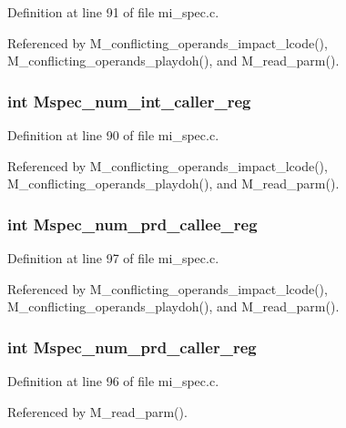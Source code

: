 Definition at line 91 of file mi\_\-spec.c.

Referenced by M\_\-conflicting\_\-operands\_\-impact\_\-lcode(), M\_\-conflicting\_\-operands\_\-playdoh(), and M\_\-read\_\-parm().
\subsubsection{\setlength{\rightskip}{0pt plus 5cm}int \bf{Mspec\_\-num\_\-int\_\-caller\_\-reg}}\label{m__spec_8h_4a05d2ec29e2bcb55d1f804e384021ef}




Definition at line 90 of file mi\_\-spec.c.

Referenced by M\_\-conflicting\_\-operands\_\-impact\_\-lcode(), M\_\-conflicting\_\-operands\_\-playdoh(), and M\_\-read\_\-parm().
\subsubsection{\setlength{\rightskip}{0pt plus 5cm}int \bf{Mspec\_\-num\_\-prd\_\-callee\_\-reg}}\label{m__spec_8h_b75395ef938b5ab6a4c21981b5a3ba8c}




Definition at line 97 of file mi\_\-spec.c.

Referenced by M\_\-conflicting\_\-operands\_\-impact\_\-lcode(), M\_\-conflicting\_\-operands\_\-playdoh(), and M\_\-read\_\-parm().
\subsubsection{\setlength{\rightskip}{0pt plus 5cm}int \bf{Mspec\_\-num\_\-prd\_\-caller\_\-reg}}\label{m__spec_8h_9ba912056714409fc62897a5acee32d0}




Definition at line 96 of file mi\_\-spec.c.

Referenced by M\_\-read\_\-parm().